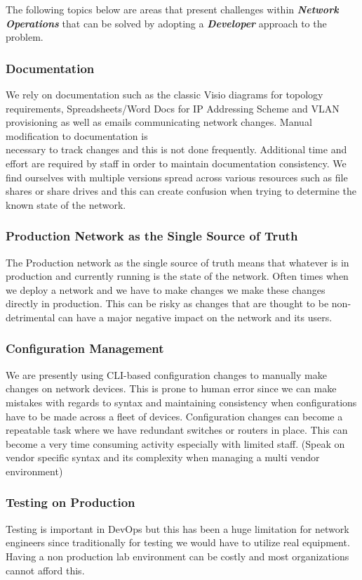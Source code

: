 \documentclass[12pt, letterpaper]{article}
\begin{document}
\medskip

The following topics below are areas that present challenges within \textbf{\textit{Network Operations}} that can be solved by adopting a \textbf{\textit{Developer}} approach to the problem.

	\subsubsection{Documentation}
We rely on documentation such as the classic Visio diagrams for topology requirements, Spreadsheets/Word Docs for IP Addressing Scheme and VLAN provisioning as well as emails communicating network changes. Manual modification to documentation is \\
necessary to track changes and this is not done frequently. Additional time and effort are required by staff in order to maintain documentation consistency. We find ourselves with multiple versions spread across various resources such as file shares or share drives and this can create confusion when trying to determine the known state of the network.

	\subsubsection{Production Network as the Single Source of Truth}
The Production network as the single source of truth means that whatever is in production and currently running is the state of the network. Often times when we deploy a network and we have to make changes we make these changes directly in production. This can be risky as changes that are thought to be non-detrimental can have a major negative impact on the network and its users. 
	
	\subsubsection{Configuration Management}
We are presently using CLI-based configuration changes to manually make changes on network devices. This is prone to human error since we can make mistakes with regards to syntax and maintaining consistency when configurations have to be made across a fleet of devices. Configuration changes can become a repeatable task where we have redundant switches or routers in place. This can become a very time consuming activity especially with limited staff. (Speak on vendor specific syntax and its complexity when managing a multi vendor environment)
	
	\subsubsection{Testing on Production}
Testing is important in DevOps but this has been a huge limitation for network engineers since traditionally for testing we would have to utilize real equipment. Having a non production lab environment can be costly and most organizations cannot afford this. 
	
\end{document}
